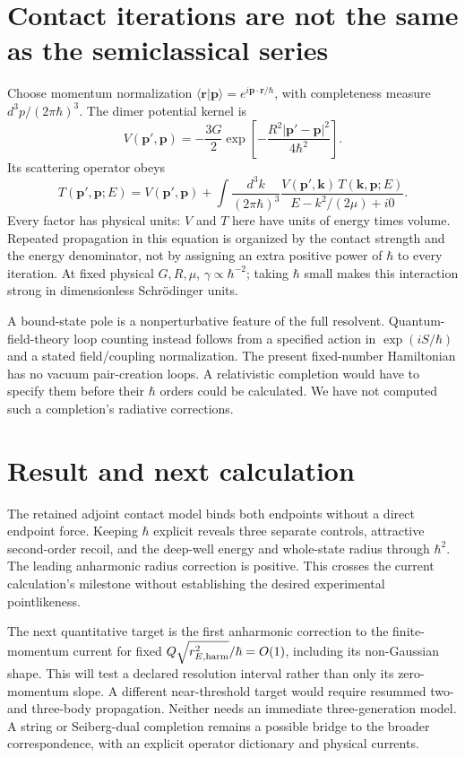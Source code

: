 \section{Contact iterations are not the same as the semiclassical series}
Choose momentum normalization
$\langle\mathbf r|\mathbf p\rangle=e^{i\mathbf p\cdot\mathbf r/\hbar}$, with completeness measure $d^3p/(2\pi\hbar)^3$. The dimer potential kernel is
\begin{equation}
 V(\mathbf p',\mathbf p)
 =-\frac{3G}{2}
   \exp\!\left[-\frac{R^2|\mathbf p'-\mathbf p|^2}{4\hbar^2}\right].
\end{equation}
Its scattering operator obeys
\begin{equation}
 T(\mathbf p',\mathbf p;E)=V(\mathbf p',\mathbf p)
 +\int\frac{d^3k}{(2\pi\hbar)^3}
 \frac{V(\mathbf p',\mathbf k)\,T(\mathbf k,\mathbf p;E)}
      {E-k^2/(2\mu)+i0}.
 \label{eq:ls}
\end{equation}
Every factor has physical units: $V$ and $T$ here have units of energy times volume. Repeated propagation in this equation is organized by the contact strength and the energy denominator, not by assigning an extra positive power of $\hbar$ to every iteration. At fixed physical $G,R,\mu$, $\gamma\propto\hbar^{-2}$; taking $\hbar$ small makes this interaction strong in dimensionless Schr\"odinger units.

A bound-state pole is a nonperturbative feature of the full resolvent. Quantum-field-theory loop counting instead follows from a specified action in $\exp(iS/\hbar)$ and a stated field/coupling normalization. The present fixed-number Hamiltonian has no vacuum pair-creation loops. A relativistic completion would have to specify them before their $\hbar$ orders could be calculated. We have not computed such a completion's radiative corrections.

\section{Result and next calculation}
The retained adjoint contact model binds both endpoints without a direct endpoint force. Keeping $\hbar$ explicit reveals three separate controls, attractive second-order recoil, and the deep-well energy and whole-state radius through $\hbar^2$. The leading anharmonic radius correction is positive. This crosses the current calculation's milestone without establishing the desired experimental pointlikeness.

The next quantitative target is the first anharmonic correction to the finite-momentum current for fixed $Q\sqrt{r_{E,{\rm harm}}^2}/\hbar=O(1)$, including its non-Gaussian shape. This will test a declared resolution interval rather than only its zero-momentum slope. A different near-threshold target would require resummed two- and three-body propagation. Neither needs an immediate three-generation model. A string or Seiberg-dual completion remains a possible bridge to the broader correspondence, with an explicit operator dictionary and physical currents.

